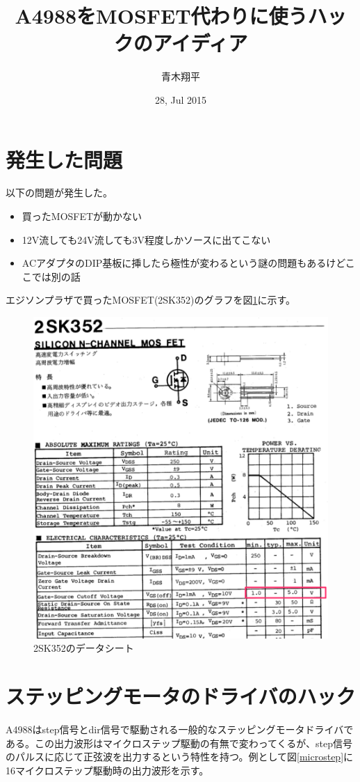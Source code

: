 \documentclass[]{jsarticle}
\begin{document}
\title{A4988をMOSFET代わりに使うハックのアイディア}
\author{青木翔平}
\date{28, Jul 2015}
\maketitle

\section{発生した問題}
以下の問題が発生した。
\begin{itemize}
\item 買ったMOSFETが動かない
\item 12V流しても24V流しても3V程度しかソースに出てこない
\item ACアダプタのDIP基板に挿したら極性が変わるという謎の問題もあるけどここでは別の話
\end{itemize}

エジソンプラザで買ったMOSFET(2SK352)のグラフを図\ref{2sk352}に示す。
\begin{figure}[htbp]
\centering
\includegraphics[width=130mm]{./image/2sk352.pdf}
\caption{2SK352のデータシート}
\label{2sk352}
\end{figure}

\section{ステッピングモータのドライバのハック}
A4988はstep信号とdir信号で駆動される一般的なステッピングモータドライバである。この出力波形はマイクロステップ駆動の有無で変わってくるが、step信号のパルスに応じて正弦波を出力するという特性を持つ。例として図\ref{microstep}に16マイクロステップ駆動時の出力波形を示す。
\end{document}
